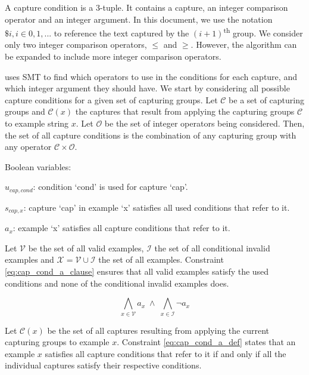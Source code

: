 A capture condition is a 3-tuple. It contains a capture, an integer comparison operator and an integer argument. In this document, we use the notation \(\$i, i \in 0, 1, ...\) to reference the text captured by the \((i+1)\)\textsuperscript{th} group. We consider only two integer comparison operators, $\le$ and $\ge$. However, the algorithm can be expanded to include more integer comparison operators.

\Forest uses \ac{SMT} to find which operators to use in the conditions for each capture, and which integer argument they should have. We start by considering all possible capture conditions for a given set of capturing groups. Let \(\mathcal{C}\) be a set of capturing groups and \(\mathcal{C}(x)\) the captures that result from applying the capturing groups \(\mathcal{C}\) to example string \(x\). Let \(\mathcal{O}\) be the set of integer operators being considered. Then, the set of all capture conditions is the combination of any capturing group with any operator \(\mathcal{C} \times \mathcal{O}\).




Boolean variables:

\(u_{cap, cond}\): condition `cond' is used for capture `cap'.

\(s_{cap, x}\): capture `cap' in example `x' satisfies all used conditions that refer to it.

\(a_x\): example `x' satisfies all capture conditions that refer to it.

Let \(\mathcal{V}\) be the set of all valid examples, \(\mathcal{I}\) the set of all conditional invalid examples and \(\mathcal{X} = \mathcal{V} \cup \mathcal{I}\) the set of all examples. Constraint \ref{eq:cap_cond_a_clause} ensures that all valid examples satisfy the used conditions and none of the conditional invalid examples does.

\begin{equation}\label{eq:cap_cond_a_clause}
    \bigwedge_{x \in \mathcal{V}} a_x \;\land\; \bigwedge_{x \in \mathcal{I}} \neg a_x
\end{equation}

Let \(\mathcal{C}(x)\) be the set of all captures resulting from applying the current capturing groups to example \(x\). Constraint \ref{eq:cap_cond_a_def} states that an example \(x\) satisfies all capture conditions that refer to it if and only if all the individual captures satisfy their respective conditions.

